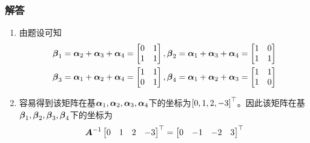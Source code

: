 \documentclass{beamer}
\begin{document}
\begin{frame}
    \frametitle{解答}
    \begin{enumerate}
        \item {
              由题设可知
              \begin{align*}
                  \boldsymbol{\beta}_1 & =\boldsymbol{\alpha}_2+\boldsymbol{\alpha}_3+\boldsymbol{\alpha}_4=\begin{bmatrix}0&1\\1&1\end{bmatrix},
                  \boldsymbol{\beta}_2=\boldsymbol{\alpha}_1+\boldsymbol{\alpha}_3+\boldsymbol{\alpha}_4=\begin{bmatrix}1&0\\1&1\end{bmatrix}     \\
                  \boldsymbol{\beta}_3 & =\boldsymbol{\alpha}_1+\boldsymbol{\alpha}_2+\boldsymbol{\alpha}_4=\begin{bmatrix}1&1\\0&1\end{bmatrix},
                  \boldsymbol{\beta}_4=\boldsymbol{\alpha}_1+\boldsymbol{\alpha}_2+\boldsymbol{\alpha}_3=\begin{bmatrix}1&1\\1&0\end{bmatrix}
              \end{align*}
              }\pause
        \item {
              容易得到该矩阵在基\(\boldsymbol{\alpha}_1,\boldsymbol{\alpha}_2,\boldsymbol{\alpha}_3,\boldsymbol{\alpha}_4\)下的坐标为\(\left[ 0,1,2,-3 \right]^\top\)。因此该矩阵在基\(\boldsymbol{\beta}_1,\boldsymbol{\beta}_2,\boldsymbol{\beta}_3,\boldsymbol{\beta}_4\)下的坐标为
              \begin{equation*}
                  {\boldsymbol{A}}^{-1}\begin{bmatrix}0&1&2&-3\end{bmatrix}^\top=\begin{bmatrix}0&-1&-2&3\end{bmatrix}^\top
              \end{equation*}
              }
    \end{enumerate}
\end{frame}
\end{document}
